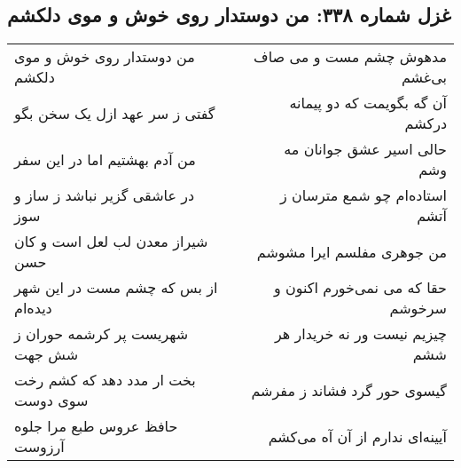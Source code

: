 \begin{center}
\section*{غزل شماره ۳۳۸: من دوستدار روی خوش و موی دلکشم}
\label{sec:sh338}
\begin{longtable}{l p{0.5cm} r}
من دوستدار روی خوش و موی دلکشم
&&
مدهوش چشم مست و می صاف بی‌غشم
\\
گفتی ز سر عهد ازل یک سخن بگو
&&
آن گه بگویمت که دو پیمانه درکشم
\\
من آدم بهشتیم اما در این سفر
&&
حالی اسیر عشق جوانان مه وشم
\\
در عاشقی گزیر نباشد ز ساز و سوز
&&
استاده‌ام چو شمع مترسان ز آتشم
\\
شیراز معدن لب لعل است و کان حسن
&&
من جوهری مفلسم ایرا مشوشم
\\
از بس که چشم مست در این شهر دیده‌ام
&&
حقا که می نمی‌خورم اکنون و سرخوشم
\\
شهریست پر کرشمه حوران ز شش جهت
&&
چیزیم نیست ور نه خریدار هر ششم
\\
بخت ار مدد دهد که کشم رخت سوی دوست
&&
گیسوی حور گرد فشاند ز مفرشم
\\
حافظ عروس طبع مرا جلوه آرزوست
&&
آیینه‌ای ندارم از آن آه می‌کشم
\\
\end{longtable}
\end{center}

